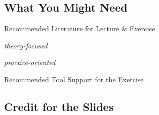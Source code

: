 \subsection{What You Might Need}

\begin{frame}{\myframetitle{}}
	\myframeicon{\mytitlesource{\fospl, \featureide}}
	\begin{fancycolumns}
		\begin{exampletight}{Recommended Literature for Lecture \& Exercise}
			\centering
			\parbox{0.49\linewidth}{
				\centering
				\emph{theory-focused}
			}
			\parbox{0.475\linewidth}{
				\centering
				\emph{practice-oriented}
			}
		\end{exampletight}
		\nextcolumn
		\begin{exampletight}{Recommended Tool Support for the Exercise}
			\centering
			\\[.5ex]
		\end{exampletight}
	\end{fancycolumns}
\end{frame}

\subsection{Credit for the Slides}

